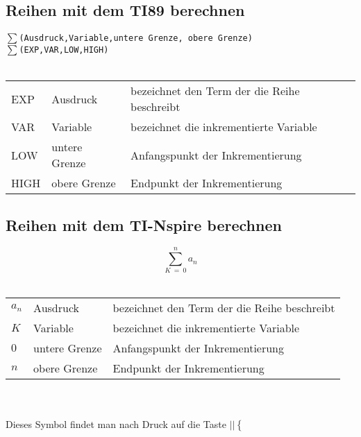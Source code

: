 \subsection{Reihen mit dem TI89 berechnen}
$\sum$\verb{(Ausdruck,Variable,untere Grenze, obere Grenze){ \\
$\sum$\verb{(EXP,VAR,LOW,HIGH){ \\\\
\begin{tabular}{lll}
EXP  & Ausdruck      & bezeichnet den Term der die Reihe beschreibt \\
VAR  & Variable      & bezeichnet die inkrementierte Variable \\
LOW  & untere Grenze & Anfangspunkt der Inkrementierung \\
HIGH & obere Grenze  & Endpunkt der Inkrementierung \\
\end{tabular}
\fi
\ifnspire
\subsection{Reihen mit dem TI-Nspire berechnen}
\[ \sum_{\boxed{K} ~=~ \boxed{0}}^{\boxed{n}}\boxed{a_n} \]\\
\begin{tabular}{lll}
$\boxed{a_n}$  & Ausdruck      & bezeichnet den Term der die Reihe beschreibt \\
$\boxed{K}$     & Variable      & bezeichnet die inkrementierte Variable \\
$\boxed{0}$    & untere Grenze & Anfangspunkt der Inkrementierung \\
$\boxed{n}$ & obere Grenze  & Endpunkt der Inkrementierung \\
\end{tabular}\\\\
Dieses Symbol findet man nach Druck auf die Taste 
$\boxed{\boxed{|\boxed{}|\left\{\frac{\boxed{}}{\boxed{}}\right.}}$
\fi
